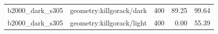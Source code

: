 \begin{longtable}{l>{\raggedright\arraybackslash}p{.42\linewidth}rrr}
b2000\_\allowbreak{}dark\_\allowbreak{}s305 & %
geometry:killgorack/dark & %
400 & %
89.25 & %
99.64 \\ %

b2000\_\allowbreak{}dark\_\allowbreak{}s305 & %
geometry:killgorack/light & %
400 & %
0.00 & %
55.39 \\ %


\end{longtable}
